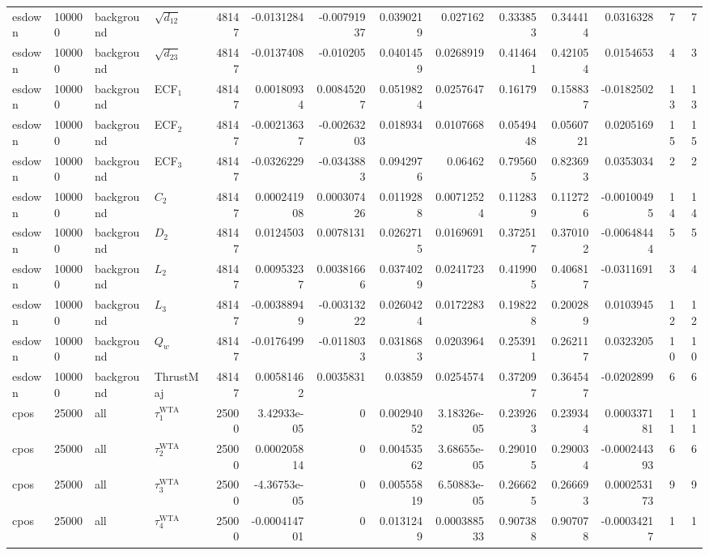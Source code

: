 \begin{landscape}
\begin{longtable}{llll r rrrr rr r rr}
esdown & 100000 & background & $\sqrt{d_{12}}$ & 48147 & -0.0131284 & -0.00791937 & 0.0390219 & 0.027162 & 0.333853 & 0.344414 & 0.0316328 & 7 & 7 \\
esdown & 100000 & background & $\sqrt{d_{23}}$ & 48147 & -0.0137408 & -0.010205 & 0.0401459 & 0.0268919 & 0.414641 & 0.421054 & 0.0154653 & 4 & 3 \\
esdown & 100000 & background & ECF$_1$ & 48147 & 0.00180934 & 0.00845207 & 0.0519824 & 0.0257647 & 0.16179 & 0.158837 & -0.0182502 & 13 & 13 \\
esdown & 100000 & background & ECF$_2$ & 48147 & -0.00213637 & -0.00263203 & 0.018934 & 0.0107668 & 0.0549448 & 0.0560721 & 0.0205169 & 15 & 15 \\
esdown & 100000 & background & ECF$_3$ & 48147 & -0.0326229 & -0.0343883 & 0.0942976 & 0.06462 & 0.795605 & 0.823693 & 0.0353034 & 2 & 2 \\
esdown & 100000 & background & $C_2$ & 48147 & 0.000241908 & 0.000307426 & 0.0119288 & 0.00712524 & 0.112839 & 0.112726 & -0.00100495 & 14 & 14 \\
esdown & 100000 & background & $D_2$ & 48147 & 0.0124503 & 0.0078131 & 0.0262715 & 0.0169691 & 0.372517 & 0.370102 & -0.00648444 & 5 & 5 \\
esdown & 100000 & background & $L_2$ & 48147 & 0.00953237 & 0.00381666 & 0.0374029 & 0.0241723 & 0.419905 & 0.406817 & -0.0311691 & 3 & 4 \\
esdown & 100000 & background & $L_3$ & 48147 & -0.00388949 & -0.00313222 & 0.0260424 & 0.0172283 & 0.198228 & 0.200289 & 0.0103945 & 12 & 12 \\
esdown & 100000 & background & $Q_w$ & 48147 & -0.0176499 & -0.0118033 & 0.0318683 & 0.0203964 & 0.253911 & 0.262117 & 0.0323205 & 10 & 10 \\
esdown & 100000 & background & ThrustMaj & 48147 & 0.00581462 & 0.0035831 & 0.03859 & 0.0254574 & 0.372097 & 0.364547 & -0.0202899 & 6 & 6 \\
cpos & 25000 & all & $\tau_1^{\mathrm{WTA}}$ & 25000 & 3.42933e-05 & 0 & 0.00294052 & 3.18326e-05 & 0.239263 & 0.239344 & 0.000337181 & 11 & 11 \\
cpos & 25000 & all & $\tau_2^{\mathrm{WTA}}$ & 25000 & 0.000205814 & 0 & 0.00453562 & 3.68655e-05 & 0.290105 & 0.290034 & -0.000244393 & 6 & 6 \\
cpos & 25000 & all & $\tau_3^{\mathrm{WTA}}$ & 25000 & -4.36753e-05 & 0 & 0.00555819 & 6.50883e-05 & 0.266625 & 0.266693 & 0.000253173 & 9 & 9 \\
cpos & 25000 & all & $\tau_4^{\mathrm{WTA}}$ & 25000 & -0.000414701 & 0 & 0.0131249 & 0.000388533 & 0.907388 & 0.907078 & -0.00034217 & 1 & 1 \\

\end{longtable}
\end{landscape}

